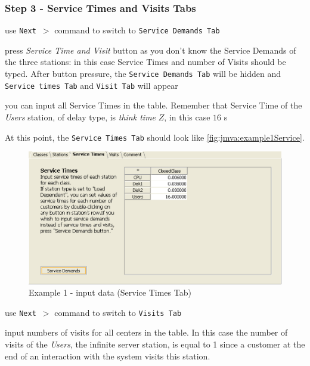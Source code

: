 \subsubsection{Step 3 - Service Times and Visits Tabs}
\begin{itemize*}
\item use \texttt{Next $>$} command to switch to \texttt{Service Demands Tab}
\item press \emph{Service Time and Visit} button as you don't know
the Service Demands of the three stations: in this case Service
Times and number of Visits should be typed. After button pressure,
the \texttt{Service Demands Tab} will be hidden and \texttt{Service
times Tab} and \texttt{Visit Tab} will appear
\item you can input all Service Times in the table.
Remember that Service Time of the \emph{Users} station, of delay
type, is \emph{think time} $Z$, in this case $16$ s
\end{itemize*}

At this point, the \texttt{Service Times Tab} should look like
\autoref{fig:jmva:example1Service}.

\begin{figure}[htbp]
    \begin{center}
        \includegraphics[scale=.5]{img/jmva/example1Service}
    \end{center}
    \caption{Example 1 - input data (Service Times Tab)}
    \label{fig:jmva:example1Service}
\end{figure}

\begin{itemize*}
\item use \texttt{Next $>$} command to switch to \texttt{Visits Tab}
\item input numbers of visits for all centers in the
table. In this case the number of visits of the \emph{Users}, the
infinite server station, is equal to 1 since a customer at the end
of an interaction with the system visits this station.
\end{itemize*}

